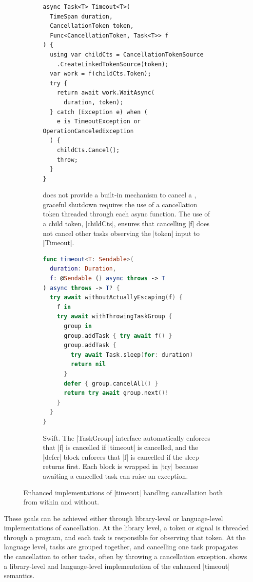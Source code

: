 \begin{figure}[t]
\begin{subfigure}{0.51\linewidth}
  \begin{lstlisting}[language=CSharp]
async Task<T> Timeout<T>(
  TimeSpan duration,
  CancellationToken token,
  Func<CancellationToken, Task<T>> f
) {
  using var childCts = CancellationTokenSource
    .CreateLinkedTokenSource(token);
  var work = f(childCts.Token);
  try {
    return await work.WaitAsync(
      duration, token);
  } catch (Exception e) when (
    e is TimeoutException or OperationCanceledException
  ) {
    childCts.Cancel();
    throw;
  }
}
\end{lstlisting}
\cprotect\caption{\CSharp does not provide a built-in mechanism to cancel a , graceful shutdown requires the use of a cancellation token threaded through each async function. The use of a child token, \code|childCts|, ensures that cancelling \code|f| does not cancel other tasks observing the \code|token| input to \code|Timeout|.}
\label{fig:timeout-tokio}
\end{subfigure}%
\hfill
\begin{subfigure}{0.47\linewidth}
  \begin{lstlisting}[language=Swift]
func timeout<T: Sendable>(
  duration: Duration,
  f: @Sendable () async throws -> T
) async throws -> T? {
  try await withoutActuallyEscaping(f) {
    f in
    try await withThrowingTaskGroup {
      group in
      group.addTask { try await f() }
      group.addTask {
        try await Task.sleep(for: duration)
        return nil
      }
      defer { group.cancelAll() }
      return try await group.next()!
    }
  }
}
\end{lstlisting}
\cprotect\caption{Swift. The \code|TaskGroup| interface automatically enforces that \code|f| is cancelled if \code|timeout| is cancelled, and the \code|defer| block enforces that \code|f| is cancelled if the sleep returns first. Each block is wrapped in \code|try| because awaiting a cancelled task can raise an exception.}
\end{subfigure}
  \cprotect\caption{Enhanced implementations of \code|timeout| handling cancellation both from within and without.}
  \label{fig:timeout-cancel}
\end{figure}

These goals can be achieved either through library-level or language-level implementations of cancellation. At the library level, a token or signal is threaded through a program, and each task is responsible for observing that token. At the language level, tasks are grouped together, and cancelling one task propagates the cancellation to other tasks, often by throwing a cancellation exception.  shows a library-level and language-level implementation of the enhanced \code|timeout| semantics.

